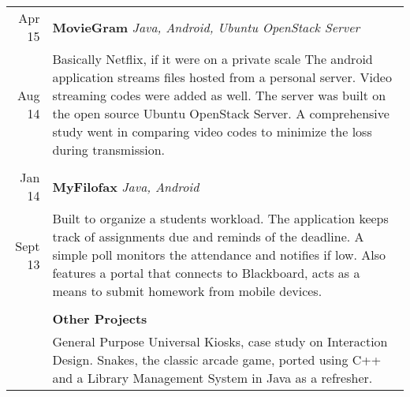 \documentclass[a4paper,10pt]{article}
\begin{document}
\begin{tabular}{r|p{15cm}}
Apr \textquotesingle{}15 & {\textbf{MovieGram}} {\sl Java, Android, Ubuntu OpenStack Server}\\
Aug \textquotesingle{}14 & \footnotesize{Basically Netflix, if it were on a private scale The android application streams files hosted from a personal server. Video streaming codes were added as well. The server was built on the open source Ubuntu OpenStack Server. A comprehensive study went in comparing video codes to minimize the loss during transmission.}\\\multicolumn{2}{c}{}\\

Jan \textquotesingle{}14 & {\textbf{MyFilofax}} {\sl Java, Android}\\
Sept \textquotesingle{}13 & \footnotesize{Built to organize a student\textquotesingle{}s workload. The application keeps track of assignments due and reminds of the deadline. A simple poll monitors the attendance and notifies if low. Also features a portal that connects to Blackboard, acts as a means to submit homework from mobile devices.}\\\multicolumn{2}{c}{}\\

&{\textbf{Other Projects}}\\
&\footnotesize{General Purpose Universal Kiosks, case study on Interaction Design. Snakes, the classic arcade game, ported using C++ and a Library Management System in Java as a refresher.}\\%
      

\end{tabular}
\end{document}
